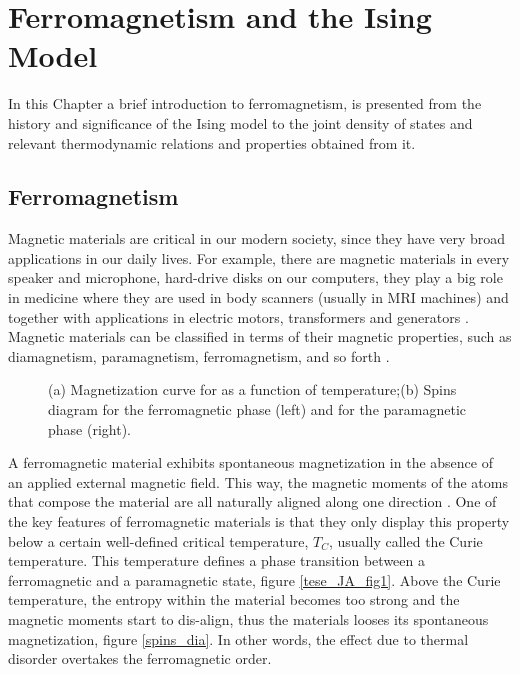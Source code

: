 \chapter{Ferromagnetism and the Ising Model}

In this Chapter  a brief introduction to ferromagnetism, is presented from the history and significance of the Ising model to the joint density of states and relevant thermodynamic relations and properties obtained from it.

\section{Ferromagnetism}

Magnetic materials are critical in our modern society, since they have very broad applications in our daily lives. For example, there are magnetic materials in every speaker and microphone, hard-drive disks on our computers, they play a big role in medicine where they are used in body scanners (usually in MRI machines) and together with applications in electric motors, transformers and generators \cite{Gutfleisch2011}. Magnetic materials can be classified in terms of their magnetic properties, such as diamagnetism, paramagnetism, ferromagnetism, and so forth \cite{Griffiths}. 

\begin{figure}[ht]
\centering
{}
\quad
\quad
\quad
{}

\caption{(a) Magnetization curve for  as a function of temperature;(b) Spins diagram for the ferromagnetic phase (left) and for the paramagnetic phase (right).}

\end{figure}

A ferromagnetic material exhibits spontaneous magnetization in the absence of an applied external magnetic field. This way, the magnetic moments of the atoms that compose the material are all naturally aligned along one direction \cite{StephenBlundell2001}. One of the key features of ferromagnetic materials is that they only display this property below a certain well-defined critical temperature, $T_C$, usually called the Curie temperature. This temperature defines a phase transition between a ferromagnetic and a paramagnetic state, figure \ref{tese_JA_fig1}. 
Above the Curie temperature, the entropy within the material becomes too strong and the magnetic moments start to dis-align, thus the materials looses its spontaneous magnetization, figure \ref{spins_dia}.  In other words, the effect due to thermal disorder overtakes the ferromagnetic order.

